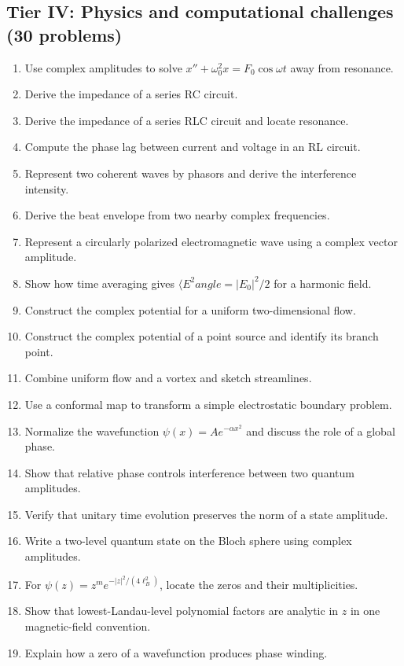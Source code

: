 \subsection*{Tier IV: Physics and computational challenges (30 problems)}
\begin{enumerate}[label=\textbf{\arabic*.},leftmargin=*]
\item Use complex amplitudes to solve $x''+\omega_0^2x=F_0\cos\omega t$ away from resonance.
\item Derive the impedance of a series RC circuit.
\item Derive the impedance of a series RLC circuit and locate resonance.
\item Compute the phase lag between current and voltage in an RL circuit.
\item Represent two coherent waves by phasors and derive the interference intensity.
\item Derive the beat envelope from two nearby complex frequencies.
\item Represent a circularly polarized electromagnetic wave using a complex vector amplitude.
\item Show how time averaging gives $\langle E^2
angle=|E_0|^2/2$ for a harmonic field.
\item Construct the complex potential for a uniform two-dimensional flow.
\item Construct the complex potential of a point source and identify its branch point.
\item Combine uniform flow and a vortex and sketch streamlines.
\item Use a conformal map to transform a simple electrostatic boundary problem.
\item Normalize the wavefunction $\psi(x)=Ae^{-\alpha x^2}$ and discuss the role of a global phase.
\item Show that relative phase controls interference between two quantum amplitudes.
\item Verify that unitary time evolution preserves the norm of a state amplitude.
\item Write a two-level quantum state on the Bloch sphere using complex amplitudes.
\item For $\psi(z)=z^m e^{-|z|^2/(4\ell_B^2)}$, locate the zeros and their multiplicities.
\item Show that lowest-Landau-level polynomial factors are analytic in $z$ in one magnetic-field convention.
\item Explain how a zero of a wavefunction produces phase winding.

\end{enumerate}
